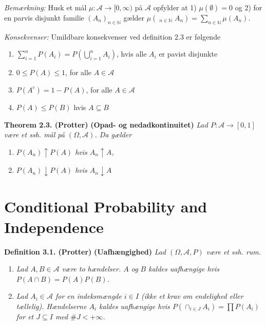 \documentclass[a4paper,12pt,openany]{book}
\providecommand{\tightlist}{%
 \setlength{\itemsep}{0pt}\setlength{\parskip}{0pt}}
\begin{document}
\emph{Bemærkning:} Husk et mål \(\mu : \mathcal{A}\to [0,\infty)\) på \(\mathcal{A}\) opfylder at 1) \(\mu(\emptyset)=0\) og 2) for en parvis disjunkt familie \((A_n)_{n\in\mathbb{N}}\) gælder \(\mu\left(\mathop{\dot{\bigcup}}_{n\in\mathbb{N}}A_n\right)=\sum_{n\in\mathbb{N}}\mu(A_n)\).

\emph{Konsekvenser:} Umildbare konsekvenser ved definition 2.3 er følgende

\begin{enumerate}
\def\labelenumi{\roman{enumi}.}
\tightlist
\item
  \(\sum_{i=1}^n P(A_i)=P\left(\bigcup_{i=1}^nA_i\right)\), hvis alle \(A_i\) er pavist disjunkte
\item
  \(0\le P(A)\le 1\), for alle \(A\in\mathcal{A}\)
\item
  \(P(A^c)=1-P(A)\), for alle \(A\in\mathcal{A}\)
\item
  \(P(A)\le P(B)\) hvis \(A\subseteq B\)
\end{enumerate}

\textbf{Theorem 2.3. (Protter)} \textbf{(Opad- og nedadkontinuitet)} \emph{Lad \(P : \mathcal{A}\to[0,1]\) være et ssh. mål på \((\Omega,\mathcal{A})\). Da gælder}

\begin{enumerate}
\def\labelenumi{\roman{enumi}.}
\setcounter{enumi}{2}
\tightlist
\item
  \emph{\(P(A_n)\uparrow P(A)\) hvis \(A_n\uparrow A\),}
\item
  \emph{\(P(A_n)\downarrow P(A)\) hvis \(A_n\downarrow A\)}
\end{enumerate}

\hypertarget{conditional-probability-and-independence}{%
\section{Conditional Probability and Independence}\label{conditional-probability-and-independence}}

\textbf{Definition 3.1. (Protter)} \textbf{(Uafhængighed)} \emph{Lad \((\Omega,\mathcal{A},P)\) være et ssh. rum.}

\begin{enumerate}
\def\labelenumi{\alph{enumi}.}
\tightlist
\item
  \emph{Lad \(A,B\in\mathcal{A}\) være to hændelser. \(A\) og \(B\) kaldes uafhængige hvis \(P(A\cap B)=P(A)P(B)\).}
\item
  \emph{Lad \(A_i\in\mathcal{A}\) for en indeksmængde \(i\in I\) (ikke et krav om endelighed eller tællelig). Hændelserne \(A_i\) kaldes uafhængige hvis \(P(\cap_{i\in J}A_i)=\prod P(A_i)\) for et \(J\subseteq I\) med \(\# J< +\infty\).}
\end{enumerate}
\end{document}
